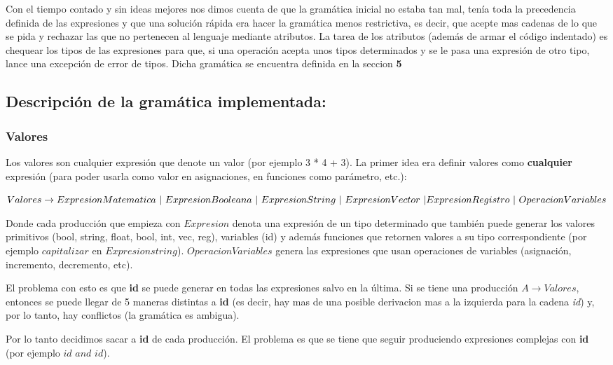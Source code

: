 Con el tiempo contado y sin ideas mejores nos dimos cuenta de que la gramática inicial no estaba tan mal, tenía toda la precedencia definida de las expresiones y que una solución rápida era hacer la gramática menos restrictiva, es decir, que acepte mas cadenas de lo que se pida y rechazar las que no pertenecen al lenguaje mediante atributos. La tarea de los atributos (además de armar el código indentado) es chequear los tipos de las expresiones para que, si una operación acepta unos tipos determinados y se le pasa una expresión de otro tipo, lance una excepción de error de tipos. Dicha gramática se encuentra definida en la seccion \textbf{5}

\subsection{Descripción de la gramática implementada:}

\subsubsection{Valores}
Los valores son cualquier expresión que denote un valor (por ejemplo 3 * 4 + 3). La primer idea era definir valores como \textbf{cualquier} expresión (para poder usarla como valor en asignaciones, en funciones como parámetro, etc.):

$Valores \rightarrow ExpresionMatematica \  | \  ExpresionBooleana \  | \ ExpresionString  \ | \ ExpresionVector \ | \ \\ ExpresionRegistro \ | \ OperacionVariables $

Donde cada producción que empieza con $Expresion$ denota una expresión de un tipo determinado que también puede generar los valores primitivos (bool, string, float, bool, int, vec, reg), variables (id) y además funciones que retornen valores a su tipo correspondiente (por ejemplo $capitalizar$ en $Expresionstring$). $OperacionVariables$ genera las expresiones que usan operaciones de variables (asignación, incremento, decremento, etc). 

El problema con esto es que \textbf{id} se puede generar en todas las expresiones salvo en la última. Si se tiene una producción $A \rightarrow Valores$, entonces se puede llegar de 5 maneras distintas a \textbf{id} (es decir, hay mas de una posible derivacion mas a la izquierda para la cadena \textit{id}) y, por lo tanto, hay conflictos (la gramática es ambigua). 

Por lo tanto decidimos sacar a \textbf{id} de cada producción. El problema es que se tiene que seguir produciendo expresiones complejas con \textbf{id} (por ejemplo $id$ $and$ $id$).

